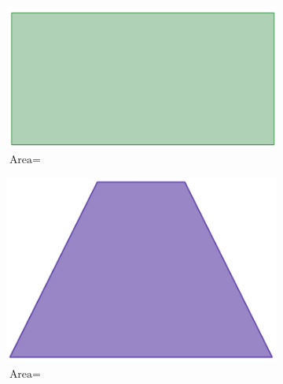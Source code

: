 \documentclass[12pt,a4paper]{article}
\begin{document}
	\begin{figure}[ht]
		\centering
		\begin{subfigure}[b]{0.32\textwidth}
			\includegraphics[scale=0.18]{rectangle.png}
			\caption{$\text{Area} = $ \phantom{AAAAA}}
		\end{subfigure}
		\hfill
		\begin{subfigure}[b]{0.32\textwidth}
			\includegraphics[scale=0.18]{trapezoide.png}
			\caption{$\text{Area} = $ \phantom{AAAAA}}
		\end{subfigure}
		\hfill
		\begin{subfigure}[b]{0.32\textwidth}

\end{subfigure}
\end{figure}
\end{document}
